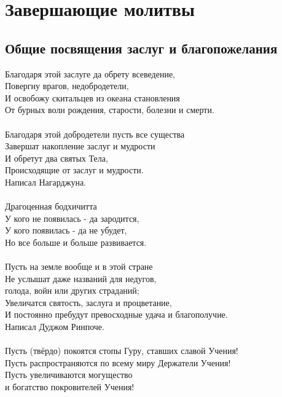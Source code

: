 
\section{Завершающие молитвы}

\subsection{Общие посвящения заслуг и благопожелания}

Благодаря этой заслуге да обрету всеведение,\\
Повергну врагов, недобродетели,\\
И освобожу скитальцев из океана становления \\
От бурных волн рождения, старости, болезни и смерти.\\
\\
Благодаря этой добродетели пусть все существа\\
Завершат накопление заслуг и мудрости \\
И обретут два святых Тела,\\
Происходящие от заслуг и мудрости.\\
Написал Нагарджуна.\\
\\
Драгоценная бодхичитта\\
У кого не появилась - да зародится,\\
У кого появилась - да не убудет,\\
Но все больше и больше развивается.\\
\\
Пусть на земле вообще и в этой стране\\
Не услышат даже названий для недугов, \\ \indent голода, войн или других страданий;\\
Увеличатся святость, заслуга и процветание,\\
И постоянно пребудут превосходные удача и благополучие.\\
Написал Дуджом Ринпоче.\\
\\
Пусть (твёрдо) покоятся стопы Гуру, ставших славой Учения!\\
Пусть распространяются по всему миру Держатели Учения!\\
Пусть увеличиваются могущество \\ \indent и богатство покровителей Учения!\\
